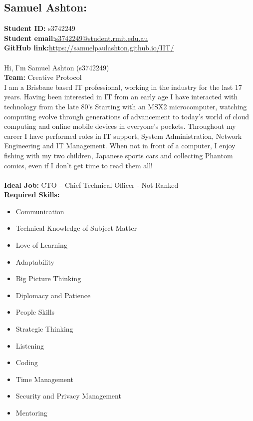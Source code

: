 \documentclass[11pt, oneside, a4paper, titlepage]{article}
\begin{document}
\subsection{Samuel Ashton:}
\textbf{Student ID:} \hfill s3742249\\
\textbf{Student email:}\hfill \href{mailto:s3742249@student.rmit.edu.au}{s3742249@student.rmit.edu.au}\\
\textbf{GitHub link:}\hfill \href{https://samuelpaulashton.github.io/IIT/}{https://samuelpaulashton.github.io/IIT/}\\
\\
Hi, I'm Samuel Ashton (s3742249)
\\
\textbf{Team:} Creative Protocol
\\
I am a Brisbane based IT professional, working in the industry for the last 17 years.  Having been interested in IT from an early age I have interacted with technology from the late 80's Starting with an MSX2 microcomputer, watching computing evolve through generations of advancement to today's world of cloud computing and online mobile devices in everyone's pockets.  Throughout my career I have performed roles in IT support, System Administration, Network Engineering and IT Management.  When not in front of a computer, I enjoy fishing with my two children, Japanese sports cars and collecting Phantom comics, even if I don’t get time to read them all! 
\\
\\
\textbf{Ideal Job:} \hfill CTO – Chief Technical Officer - Not Ranked\\
\textbf{Required Skills: }
\begin{itemize}
	\setlength\itemsep{0em}
	\item Communication
	\item	Technical Knowledge of Subject Matter
	\item	Love of Learning
	\item	Adaptability
	\item	Big Picture Thinking
	\item	Diplomacy and Patience
	\item	People Skills
	\item	Strategic Thinking
	\item	Listening
	\item	Coding
	\item	Time Management
	\item	Security and Privacy Management
	\item	Mentoring
\end{itemize}
\newpage
\end{document}

